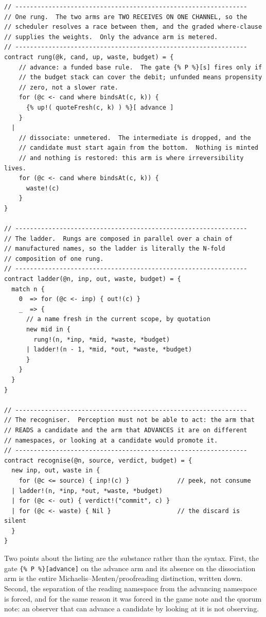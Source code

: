 \documentclass[11pt]{article}
\theoremstyle{plain}
\theoremstyle{definition}
\theoremstyle{remark}
\begin{document}
\begin{lstlisting}
// ---------------------------------------------------------------
// One rung.  The two arms are TWO RECEIVES ON ONE CHANNEL, so the
// scheduler resolves a race between them, and the graded where-clause
// supplies the weights.  Only the advance arm is metered.
// ---------------------------------------------------------------
contract rung(@k, cand, up, waste, budget) = {
    // advance: a funded base rule.  The gate {% P %}[s] fires only if
    // the budget stack can cover the debit; unfunded means propensity
    // zero, not a slower rate.
    for (@c <- cand where bindsAt(c, k)) {
      {% up!( quoteFresh(c, k) ) %}[ advance ]
    }
  |
    // dissociate: unmetered.  The intermediate is dropped, and the
    // candidate must start again from the bottom.  Nothing is minted
    // and nothing is restored: this arm is where irreversibility lives.
    for (@c <- cand where bindsAt(c, k)) {
      waste!(c)
    }
}

// ---------------------------------------------------------------
// The ladder.  Rungs are composed in parallel over a chain of
// manufactured names, so the ladder is literally the N-fold
// composition of one rung.
// ---------------------------------------------------------------
contract ladder(@n, inp, out, waste, budget) = {
  match n {
    0  => for (@c <- inp) { out!(c) }
    _  => {
      // a name fresh in the current scope, by quotation
      new mid in {
        rung!(n, *inp, *mid, *waste, *budget)
      | ladder!(n - 1, *mid, *out, *waste, *budget)
      }
    }
  }
}

// ---------------------------------------------------------------
// The recogniser.  Perception must not be able to act: the arm that
// READS a candidate and the arm that ADVANCES it are on different
// namespaces, or looking at a candidate would promote it.
// ---------------------------------------------------------------
contract recognise(@n, source, verdict, budget) = {
  new inp, out, waste in {
    for (@c <= source) { inp!(c) }             // peek, not consume
  | ladder!(n, *inp, *out, *waste, *budget)
  | for (@c <- out) { verdict!("commit", c) }
  | for (@c <- waste) { Nil }                  // the discard is silent
  }
}
\end{lstlisting}

Two points about the listing are the substance rather than the syntax. First,
the gate \texttt{\{\% P \%\}[advance]} on the advance arm and its absence on
the dissociation arm is the entire Michaelis--Menten/proofreading distinction,
written down. Second, the separation of the reading namespace from the
advancing namespace is forced, and for the same reason it was forced in the
game note and the quorum note: an observer that can advance a candidate by
looking at it is not observing.
\end{document}
